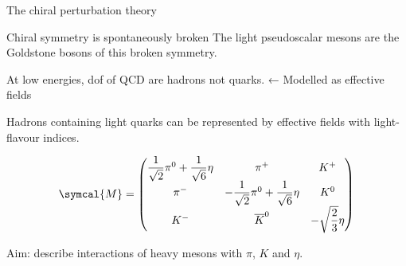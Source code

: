 \documentclass[professionalfonts,aspectratio=169]{beamer}
\newcommand{\adj}[1]{\overline{#1}}
\begin{document}
\begin{frame}{The chiral perturbation theory}
  \begin{alertblock}{Chiral symmetry is spontaneously broken}
    \vspace{0pt}
    The light pseudoscalar mesons are the Goldstone bosons of this broken symmetry.
  \end{alertblock}
  
  At low energies, dof of QCD are hadrons not quarks. ← \alert{Modelled as effective fields}
  
  Hadrons containing light quarks can be represented by effective fields with light-flavour indices.

  \begin{equation*}
    \symcal{M} = 
    \begin{pmatrix}
      \dfrac{1}{\sqrt{2}} \pi^0 + \dfrac{1}{\sqrt{6}} \eta & \pi^+ & K^+ \\
      \pi^- & - \dfrac{1}{\sqrt{2}} \pi^0 +  \dfrac{1}{\sqrt{6}} \eta & K^0 \\
      K^- & \adj{K}^0 & - \sqrt{\dfrac{2}{3}} \eta
    \end{pmatrix}
  \end{equation*}
\end{frame}

\begin{frame}[standout]
  Aim: describe interactions of heavy mesons with \(\pi\), \(K\) and \(\eta\).%
\end{frame}
\end{document}
